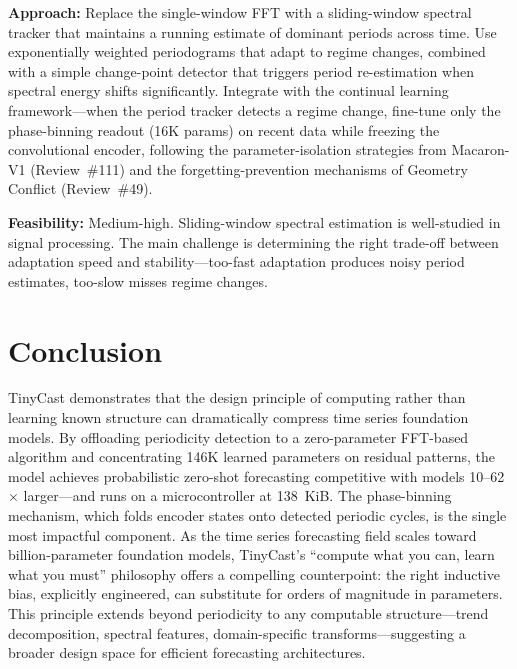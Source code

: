 \documentclass[11pt,a4paper]{article}
\begin{document}
\textbf{Approach:} Replace the single-window FFT with a sliding-window spectral tracker that maintains a running estimate of dominant periods across time. Use exponentially weighted periodograms that adapt to regime changes, combined with a simple change-point detector that triggers period re-estimation when spectral energy shifts significantly. Integrate with the continual learning framework---when the period tracker detects a regime change, fine-tune only the phase-binning readout (16K params) on recent data while freezing the convolutional encoder, following the parameter-isolation strategies from Macaron-V1 (Review~\#111) and the forgetting-prevention mechanisms of Geometry Conflict (Review~\#49).

\textbf{Feasibility:} Medium-high. Sliding-window spectral estimation is well-studied in signal processing. The main challenge is determining the right trade-off between adaptation speed and stability---too-fast adaptation produces noisy period estimates, too-slow misses regime changes.

\section{Conclusion}
TinyCast demonstrates that the design principle of computing rather than learning known structure can dramatically compress time series foundation models. By offloading periodicity detection to a zero-parameter FFT-based algorithm and concentrating 146K learned parameters on residual patterns, the model achieves probabilistic zero-shot forecasting competitive with models 10--62$\times$ larger---and runs on a microcontroller at 138~KiB. The phase-binning mechanism, which folds encoder states onto detected periodic cycles, is the single most impactful component. As the time series forecasting field scales toward billion-parameter foundation models, TinyCast's ``compute what you can, learn what you must'' philosophy offers a compelling counterpoint: the right inductive bias, explicitly engineered, can substitute for orders of magnitude in parameters. This principle extends beyond periodicity to any computable structure---trend decomposition, spectral features, domain-specific transforms---suggesting a broader design space for efficient forecasting architectures.
\end{document}
